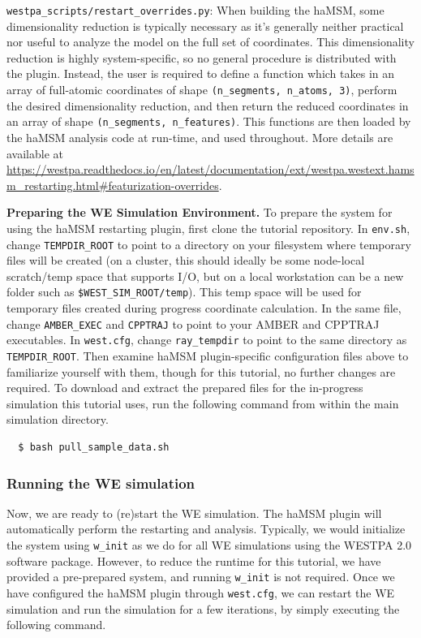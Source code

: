 \verb|westpa_scripts/restart_overrides.py|: When building the haMSM, some dimensionality reduction is typically necessary as it's generally neither practical nor useful to analyze the model on the full set of coordinates. 
This dimensionality reduction is highly system-specific, so no general procedure is distributed with the plugin. 
Instead, the user is required to define a function which takes in an array of full-atomic coordinates of shape \verb|(n_segments, n_atoms, 3)|, perform the desired dimensionality reduction, and then return the reduced coordinates in an array of shape \verb|(n_segments, n_features)|. 
This functions are then loaded by the haMSM analysis code at run-time, and used throughout. 
More details are available at {\url{https://westpa.readthedocs.io/en/latest/documentation/ext/westpa.westext.hamsm_restarting.html#featurization-overrides}}.

\textbf{Preparing the WE Simulation Environment.} To prepare the system for using the haMSM restarting plugin, first clone the tutorial repository. 
In \verb|env.sh|, change \verb|TEMPDIR_ROOT| to point to a directory on your filesystem where temporary files will be created (on a cluster, this should ideally be some node-local scratch/temp space that supports I/O, but on a local workstation can be a new folder such as \verb|$WEST_SIM_ROOT/temp|). 
This temp space will be used for temporary files created during progress coordinate calculation. 
In the same file, change \verb|AMBER_EXEC| and \verb|CPPTRAJ| to point to your AMBER and CPPTRAJ executables. 
In \verb|west.cfg|, change \verb|ray_tempdir| to point to the same directory as \verb|TEMPDIR_ROOT|. 
Then examine haMSM plugin-specific configuration files above to familiarize yourself with them, though for this tutorial, no further changes are required. 
To download and extract the prepared files for the in-progress simulation this tutorial uses, run the following command from within the main simulation directory.

\begin{verbatim}
  $ bash pull_sample_data.sh
\end{verbatim}

\subsubsection{Running the WE simulation}
Now, we are ready to (re)start the WE simulation. 
The haMSM plugin will automatically perform the restarting and analysis. Typically, we would initialize the system using \verb|w_init| as we do for all WE simulations using the WESTPA 2.0 software package. 
However, to reduce the runtime for this tutorial, we have provided a pre-prepared system, and running \verb|w_init| is not required. 
Once we have configured the haMSM plugin through \verb|west.cfg|, we can restart the WE simulation and run the simulation for a few iterations, by simply executing the following command.

